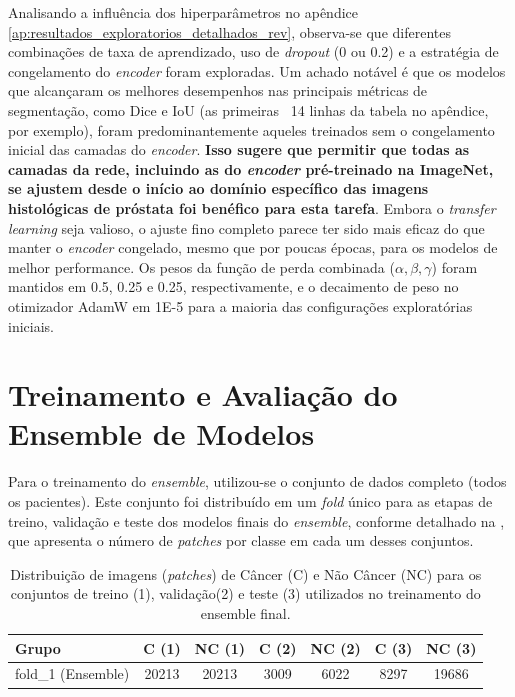 Analisando a influência dos hiperparâmetros no apêndice \ref{ap:resultados_exploratorios_detalhados_rev}, observa-se que diferentes combinações de taxa de aprendizado, uso de \textit{dropout} (0 ou 0.2) e a estratégia de congelamento do \textit{encoder} foram exploradas. Um achado notável é que os modelos que alcançaram os melhores desempenhos nas principais métricas de segmentação, como Dice e IoU (as primeiras ~14 linhas da tabela no apêndice, por exemplo), foram predominantemente aqueles treinados sem o congelamento inicial das camadas do \textit{encoder}. \textbf{Isso sugere que permitir que todas as camadas da rede, incluindo as do \textit{encoder} pré-treinado na ImageNet, se ajustem desde o início ao domínio específico das imagens histológicas de próstata foi benéfico para esta tarefa}. Embora o \textit{transfer learning} seja valioso, o ajuste fino completo parece ter sido mais eficaz do que manter o \textit{encoder} congelado, mesmo que por poucas épocas, para os modelos de melhor performance. Os pesos da função de perda combinada ($\alpha, \beta, \gamma$) foram mantidos em 0.5, 0.25 e 0.25, respectivamente, e o decaimento de peso no otimizador AdamW em 1E-5 para a maioria das configurações exploratórias iniciais.

\section{Treinamento e Avaliação do Ensemble de Modelos}\label{sec:res_treino_ensemble}

 Para o treinamento do \textit{ensemble}, utilizou-se o conjunto de dados completo (todos os pacientes). Este conjunto foi distribuído em um \textit{fold} único para as etapas de treino, validação e teste dos modelos finais do \textit{ensemble}, conforme detalhado na , que apresenta o número de \textit{patches} por classe em cada um desses conjuntos.

\begin{table}[!htp] %
\centering
\caption[Distribuição de imagens para treinamento e avaliação do ensemble.]{Distribuição de imagens (\textit{patches}) de Câncer (C) e Não Câncer (NC) para os conjuntos de treino (1), validação(2) e teste (3) utilizados no treinamento do ensemble final.}
\label{tab:distribuicao_ensemble}
\begin{tabular}{lcccccc}
\toprule
\textbf{Grupo} & \textbf{C (1)} & \textbf{NC (1)} & \textbf{C (2)} & \textbf{NC (2)} & \textbf{C (3)} & \textbf{NC (3)} \\ \midrule
fold\_1 (Ensemble) & 20213 & 20213 & 3009 & 6022 & 8297 & 19686 \\ \bottomrule
\end{tabular}
\end{table}


